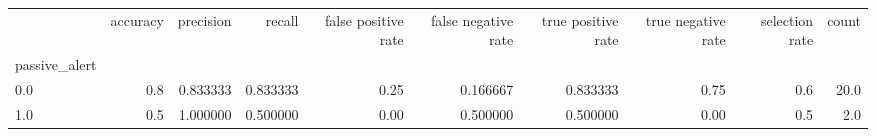 \begin{tabular}{lrrrrrrrrr}
\toprule
{} &  accuracy &  precision &    recall &  false positive rate &  false negative rate &  true positive rate &  true negative rate &  selection rate &  count \\
passive\_alert &           &            &           &                      &                      &                     &                     &                 &        \\
\midrule
0.0           &       0.8 &   0.833333 &  0.833333 &                 0.25 &             0.166667 &            0.833333 &                0.75 &             0.6 &   20.0 \\
1.0           &       0.5 &   1.000000 &  0.500000 &                 0.00 &             0.500000 &            0.500000 &                0.00 &             0.5 &    2.0 \\
\bottomrule
\end{tabular}
